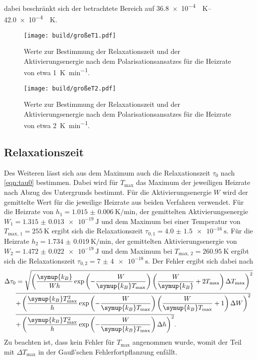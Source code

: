 dabei beschränkt sich der betrachtete Bereich auf \SIrange{36.8e-4}{42.0e-4}{\per\kelvin}.
\begin{figure}[htb]
  \centering
  \texttt{[image: build/großeT1.pdf]}
  \caption{Werte zur Bestimmung der Relaxationszeit und der Aktivierungsenergie nach dem Polarisationsansatzes für die Heizrate von etwa \SI{1}{\kelvin\per\minute}.}
  \label{fig:grT1}
\end{figure}
\begin{figure}[htb]
  \centering
  \texttt{[image: build/großeT2.pdf]}
  \caption{Werte zur Bestimmung der Relaxationszeit und der Aktivierungsenergie nach dem Polarisationsansatzes für die Heizrate von etwa \SI{2}{\kelvin\per\minute}.}
  \label{fig:grT2}
\end{figure}
\FloatBarrier

\subsection{Relaxationszeit}
\label{sec:relax}
Des Weiteren lässt sich aus dem Maximum auch die Relaxationszeit $\tau_0$ nach \eqref{eqn:tau0}
bestimmen. Dabei wird für $T_\text{max}$ das Maximum der jeweiligen Heizrate nach Abzug des Untergrunds bestimmt.
Für die Aktivierungsenergie $W$ wird der gemittelte Wert für die jeweilige Heizrate aus beiden Verfahren verwendet.
Für die Heizrate von $h_1=\SI{1.015(6)}{\kelvin\per\minute}$, der gemittelten Aktivierungsenergie $W_1 = \SI{1.315(13)e-19}{\joule}$ und dem 
Maximum bei einer Temperatur von $T_\text{max, 1} = \SI{255}{\kelvin}$ ergibt sich die Relaxationszeit $\tau_{0,1} = \SI{4.0(15)e-16}{\second}$. 
Für die Heizrate $h_2=\SI{1.734(19)}{\kelvin\per\minute}$, der gemittelten Aktivierungsenergie von $W_2 = \SI{1.472(22)e-19}{\joule}$ und dem 
Maximum bei $T_\text{max, 2} = \SI{260.95}{\kelvin}$ ergibt sich die Relaxationszeit $\tau_{0,2} = \SI{7(4)e-18}{\second}$.
Der Fehler ergibt sich dabei nach
\begin{align*}
    \label{eqn:FehlerTau}
    \Delta \tau_0 & = \sqrt{\left(\frac{\symup{k_B}}{W h} \exp\left(-\frac{W}{\symup{k_B} T_\text{max}}\right) \left(\frac{W}{\symup{k_B}} + 2 T_\text{max}\right) \Delta T_\text{max} \right)^2} \\ 
    &\overline{+ \left(\frac{\symup{k_B} T_\text{max}^2}{h} \exp\left(-\frac{W}{\symup{k_B} T_\text{max}}\right)\left(\frac{W}{\symup{k_B}T_\text{max}} + 1 \right) \Delta W \right)^2} \\ 
    &\overline{+ \left(\frac{\symup{k_B} T_\text{max}^2}{h} \exp\left(-\frac{W}{\symup{k_B} T_\text{max}}\right)\Delta h \right)^2}.
\end{align*}
Zu beachten ist, dass kein Fehler für $T_\text{max}$ angenommen wurde, womit der Teil mit $\Delta T_\text{max}$ in der Gauß'schen Fehlerfortpflanzung enfällt.


\FloatBarrier